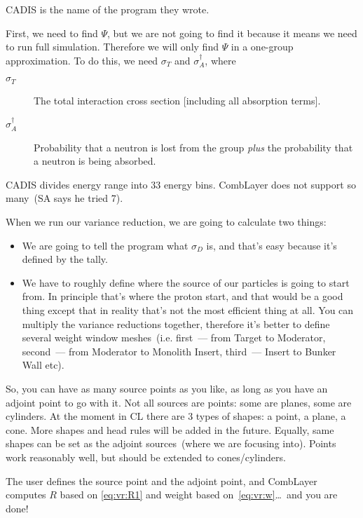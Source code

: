 CADIS is the name of the program they wrote.

First, we need to find $\Psi$, but we are not going to find it because it means we need to run full simulation.
Therefore we will only find $\Psi$ in a one-group approximation.
To do this, we need $\sigma_{T}$ and $\sigma_{A}^\dagger$, where

\begin{description}
\item[$\sigma_{T}$] The total interaction cross section [including all absorption terms].
\item[$\sigma_{A}^\dagger$] Probability that a neutron is lost from the group {\em plus} the probability that a neutron is being absorbed.
\end{description}

CADIS divides energy range into 33 energy bins. CombLayer does not support so many~(SA says he tried 7).

\bigskip

When we run our variance reduction, we are going to calculate two things:
\begin{itemize}
\item We are going to tell the program what $\sigma_D$ is, and that's easy because it's defined by the tally.
\item We have to roughly define where the source of our particles is going to start from. In principle that's where the proton start,
  and that would be a good thing except that in reality that's not the most efficient thing at all.
  You can multiply the variance reductions together, therefore it's better to define several weight window meshes~(i.e.
  first~--- from Target to Moderator, second~--- from Moderator to Monolith Insert, third~--- Insert to Bunker Wall etc).
\end{itemize}

So, you can have as many source points as you like, as long as you have an adjoint point to go with it.
Not all sources are points: some are planes, some are cylinders. At the moment in CL there are 3 types of shapes: a point, a plane, a cone.
More shapes and head rules will be added in the future.
Equally, same shapes can be set as the adjoint sources~(where we are focusing into).
Points work reasonably well, but should be extended to cones/cylinders.

The user defines the source point and the adjoint point, and CombLayer computes $R$ based on \eqref{eq:vr:R1} and
weight based on~\eqref{eq:vr:w}\dots\ and you are done!

